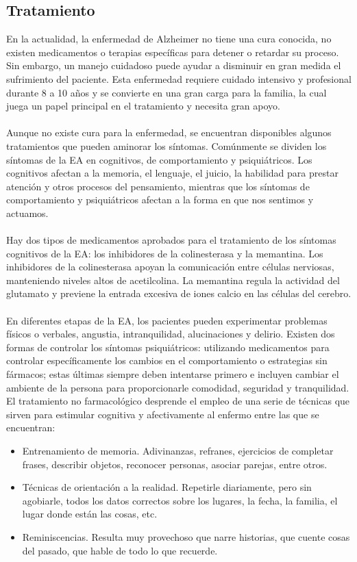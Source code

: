 \documentclass[smallextended, 12pt]{article}
\begin{document}
	\subsection{Tratamiento}
	En la actualidad, la enfermedad de Alzheimer no tiene una cura conocida, no existen medicamentos o terapias espec\'ificas para detener o retardar su proceso. Sin embargo, un manejo cuidadoso puede ayudar a disminuir en gran medida el sufrimiento del paciente. Esta enfermedad requiere cuidado intensivo y profesional durante 8 a 10 a\~nos y se convierte en una gran carga para la familia, la cual juega un papel principal en el tratamiento y necesita gran apoyo. \cite{ref8} \cite{ref6}\\
	\\
	Aunque no existe cura para la enfermedad, se encuentran disponibles algunos tratamientos que pueden aminorar los s\'intomas. Com\'unmente se dividen los s\'intomas de la EA en cognitivos, de comportamiento y psiqui\'atricos. Los cognitivos afectan a la memoria, el lenguaje, el juicio, la habilidad para prestar atenci\'on y otros procesos del pensamiento, mientras que los s\'intomas de comportamiento y psiqui\'atricos afectan a la forma en que nos sentimos y actuamos. \cite{ref5}\\
	\\
	Hay dos tipos de medicamentos aprobados para el tratamiento de los s\'intomas cognitivos de la EA: los inhibidores de la colinesterasa y la memantina. Los inhibidores de la colinesterasa apoyan la comunicaci\'on entre c\'elulas nerviosas, manteniendo niveles altos de acetilcolina. La memantina regula la actividad del glutamato y previene la entrada excesiva de iones calcio en las c\'elulas del cerebro. \cite{ref5}\\
	\\
	En diferentes etapas de la EA, los pacientes pueden experimentar problemas f\'isicos o verbales, angustia, intranquilidad, alucinaciones y delirio. Existen dos formas de controlar los s\'intomas psiqui\'atricos: utilizando medicamentos para controlar espec\'ificamente los cambios en el comportamiento o estrategias sin f\'armacos; estas \'ultimas siempre deben intentarse primero e incluyen cambiar el ambiente de la persona para proporcionarle comodidad, seguridad y tranquilidad. El tratamiento no farmacol\'ogico desprende el empleo de una serie de t\'ecnicas que sirven para estimular cognitiva y afectivamente al enfermo entre las que se encuentran:
		\begin{itemize}
			\item Entrenamiento de memoria. Adivinanzas, refranes, ejercicios de completar frases, describir objetos, reconocer personas, asociar parejas, entre otros.
			\item T\'ecnicas de orientaci\'on a la realidad. Repetirle diariamente, pero sin agobiarle, todos los datos correctos sobre los lugares, la fecha, la familia, el lugar donde est\'an las cosas, etc.
			\item Reminiscencias. Resulta muy provechoso que narre historias, que cuente cosas del pasado, que hable de todo lo que recuerde. \cite{ref3}
		\end{itemize} 
\end{document}
